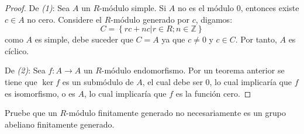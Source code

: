 \documentclass[12pt]{report}
\newcounter{it}
\theoremstyle{largebreak}
\newcommand\cf[3]{\ensuremath{#1:#2\rightarrow#3}}
\begin{document}
    \begin{proof}
        De \textit{(1)}: Sea $A$ un $R$-módulo simple. Si $A$ no es el módulo $0$, entonces existe $c\in A$ no cero. Considere el $R$-módulo generado por $c$, digamos:
        \begin{equation*}
            C=\left\{rc+nc\Big|r\in R;n\in\mathbb{Z} \right\}
        \end{equation*}
        como $A$ es simple, debe suceder que $C=A$ ya que $c\neq0$ y $c\in C$. Por tanto, $A$ es cíclico.
        
        De \textit{(2)}: Sea $\cf{f}{A}{A}$ un $R$-módulo endomorfismo. Por un teorema anterior se tiene que $\ker f$ es un submódulo de $A$, el cual debe ser 0, lo cual implicaría que $f$ es isomorfismo, o es $A$, lo cual implicaría que $f$ es la función cero.
    \end{proof}

    \begin{excer}
        Pruebe que un $R$-módulo finitamente generado no necesariamente es un grupo abeliano finitamente generado.
    \end{excer}
\end{document}

